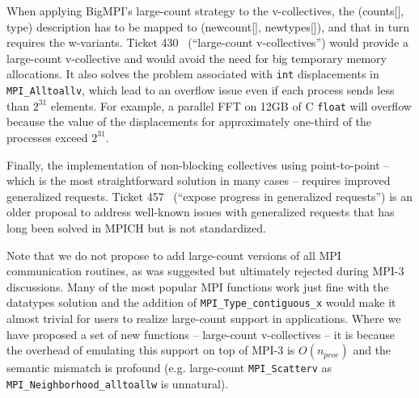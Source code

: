 When applying BigMPI's large-count strategy to the v-collectives, the (counts[], type) description 
has to be mapped to (newcount[], newtypes[]), and that in turn requires the w-variants.
Ticket 430~\cite{ticket430}
(``large-count v-collectives'') 
would provide a large-count v-collective and would avoid the need for big temporary memory allocations.
It also solves the problem associated with \texttt{int} displacements in \texttt{MPI\_Alltoallv}, which lead to
an overflow issue even if each process sends less than $2^{31}$ elements.
For example, a parallel FFT on 12GB of C \texttt{float} will overflow because the value of the displacements
for approximately one-third of the processes exceed $2^{31}$.

Finally, the implementation of non-blocking collectives using point-to-point --
which is the most straightforward solution in many cases -- 
requires improved generalized requests.
Ticket 457~\cite{ticket457} %
(``expose progress in generalized requests'') is an older proposal to address well-known
issues with generalized requests that has long been solved in MPICH but is not standardized.

Note that we do not propose to add large-count versions of all MPI communication routines,
as was suggested but ultimately rejected during MPI-3 discussions.
Many of the most popular MPI functions work just fine with the datatypes solution and
the addition of \texttt{MPI\_Type\_contiguous\_x} would make it almost trivial for users to
realize large-count support in applications.
Where we have proposed a set of new functions -- large-count v-collectives -- it is because
the overhead of emulating this support on top of MPI-3 is $O(n_{proc})$ and the semantic mismatch is
profound (e.g. large-count \texttt{MPI\_Scatterv} as \texttt{MPI\_Neighborhood\_alltoallw} is unnatural).

